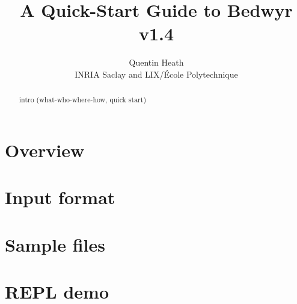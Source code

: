 \documentclass[a4paper]{article} %
\title{{\Huge A Quick-Start Guide to Bedwyr v1.4}}
\author{Quentin Heath\\INRIA Saclay and LIX/\'Ecole Polytechnique}
\begin{document}
\maketitle

\begin{abstract}
intro (what-who-where-how, quick start)
\end{abstract}

\section{Overview}

\section{Input format}

\section{Sample files}

\section{REPL demo}
\end{document}
